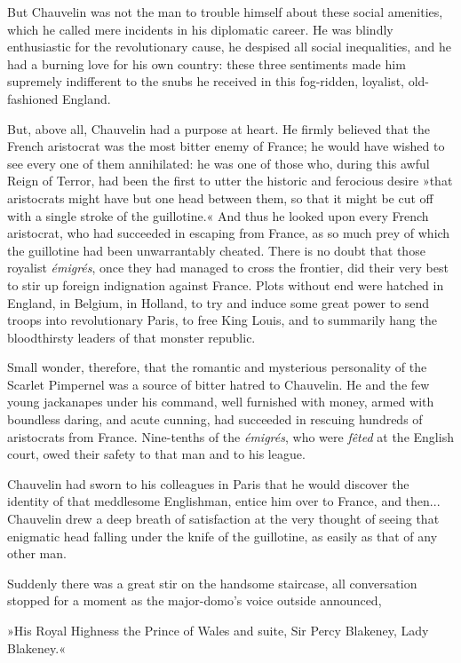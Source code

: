 But Chauvelin was not the man to trouble himself about these social amenities, which he called mere incidents in his diplomatic career. He was blindly enthusiastic for the revolutionary cause, he despised all social inequalities, and he had a burning love for his own country: these three sentiments made him supremely indifferent to the snubs he received in this fog-ridden, loyalist, old-fashioned England.

But, above all, Chauvelin had a purpose at heart. He firmly believed that the French aristocrat was the most bitter enemy of France; he would have wished to see every one of them annihilated: he was one of those who, during this awful Reign of Terror, had been the first to utter the historic and ferocious desire »that aristocrats might have but one head between them, so that it might be cut off with a single stroke of the guillotine.« And thus he looked upon every French aristocrat, who had succeeded in escaping from France, as so much prey of which the guillotine had been unwarrantably cheated. There is no doubt that those royalist \textit{émigrés}, once they had managed to cross the frontier, did their very best to stir up foreign indignation against France. Plots without end were hatched in England, in Belgium, in Holland, to try and induce some great power to send troops into revolutionary Paris, to free King Louis, and to summarily hang the bloodthirsty leaders of that monster republic.

Small wonder, therefore, that the romantic and mysterious personality of the Scarlet Pimpernel was a source of bitter hatred to Chauvelin. He and the few young jackanapes under his command, well furnished with money, armed with boundless daring, and acute cunning, had succeeded in rescuing hundreds of aristocrats from France. Nine-tenths of the \textit{émigrés}, who were \textit{fêted} at the English court, owed their safety to that man and to his league.

Chauvelin had sworn to his colleagues in Paris that he would discover the identity of that meddlesome Englishman, entice him over to France, and then... Chauvelin drew a deep breath of satisfaction at the very thought of seeing that enigmatic head falling under the knife of the guillotine, as easily as that of any other man.

Suddenly there was a great stir on the handsome staircase, all conversation stopped for a moment as the major-domo's voice outside announced,\longdash


»His Royal Highness the Prince of Wales and suite, Sir Percy Blakeney, Lady Blakeney.«

